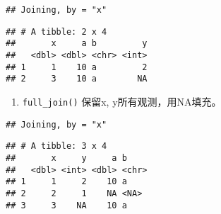 \documentclass[
]{article}
\newenvironment{Shaded}{\begin{snugshade}}{\end{snugshade}}
\newcommand{\KeywordTok}[1]{\textcolor[rgb]{0.13,0.29,0.53}{\textbf{#1}}}
\newcommand{\NormalTok}[1]{#1}
\newcommand{\OperatorTok}[1]{\textcolor[rgb]{0.81,0.36,0.00}{\textbf{#1}}}
\newcommand{\StringTok}[1]{\textcolor[rgb]{0.31,0.60,0.02}{#1}}
\providecommand{\tightlist}{%
  \setlength{\itemsep}{0pt}\setlength{\parskip}{0pt}}
\begin{document}
\begin{verbatim}
## Joining, by = "x"
\end{verbatim}

\begin{verbatim}
## # A tibble: 2 x 4
##       x     a b         y
##   <dbl> <dbl> <chr> <int>
## 1     1    10 a         2
## 2     3    10 a        NA
\end{verbatim}

\begin{enumerate}
\def\labelenumi{\arabic{enumi}.}
\setcounter{enumi}{3}
\tightlist
\item
  \texttt{full\_join()} 保留x, y所有观测，用NA填充。
\end{enumerate}

\begin{Shaded}
\end{Shaded}

\begin{verbatim}
## Joining, by = "x"
\end{verbatim}

\begin{verbatim}
## # A tibble: 3 x 4
##       x     y     a b    
##   <dbl> <int> <dbl> <chr>
## 1     1     2    10 a    
## 2     2     1    NA <NA> 
## 3     3    NA    10 a
\end{verbatim}
\end{document}
